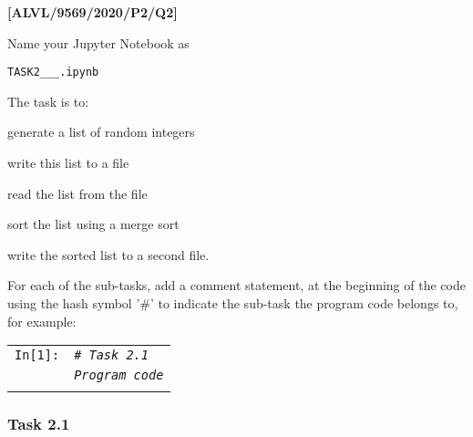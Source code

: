 \begin{onehalfspace}
\item \textbf{{[}ALVL/9569/2020/P2/Q2{]} }
\end{onehalfspace}

\begin{onehalfspace}
\noindent Name your Jupyter Notebook as 

\noindent \texttt{TASK2\_<your name>\_<centre number>\_<index number>.ipynb}

\noindent The task is to:
\end{onehalfspace}
\begin{itemize}
\begin{onehalfspace}
\item generate a list of random integers
\item write this list to a file
\item read the list from the file
\item sort the list using a merge sort
\item write the sorted list to a second file.
\end{onehalfspace}
\end{itemize}
\begin{onehalfspace}
\noindent For each of the sub-tasks, add a comment statement, at the
beginning of the code using the hash symbol '\#' to indicate the sub-task
the program code belongs to, for example:

\noindent %
\begin{tabular}{l|>{\raggedright}p{}|}
\cline{2-2} 
\texttt{In{[}1{]}:} & \texttt{\emph{\# Task 2.1}}\tabularnewline
 & \texttt{\emph{Program code}}\tabularnewline
\cline{2-2} 
\multicolumn{1}{l}{} & \multicolumn{1}{>{\raggedright}p{0.77\textwidth}}{\texttt{Output :}}\tabularnewline
\end{tabular}
\end{onehalfspace}
\begin{onehalfspace}

\subsubsection*{Task 2.1}
\end{onehalfspace}


